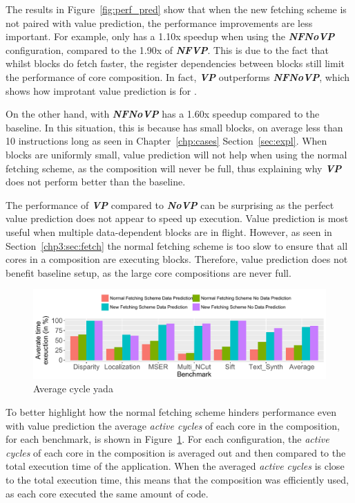 The results in Figure~\ref{fig:perf_pred} show that when the new fetching scheme is not paired with value prediction, the performance improvements are less important.
For example,  only has a 1.10x speedup when using the \textbf{\textit{NFNoVP}} configuration, compared to the 1.90x of \textbf{\textit{NFVP}}.
This is due to the fact that whilst blocks do fetch faster, the register dependencies between blocks still limit the performance of core composition.
In fact, \textbf{\textit{VP}} outperforms \textbf{\textit{NFNoVP}}, which shows how improtant value prediction is for .

On the other hand,  with \textbf{\textit{NFNoVP}} has a 1.60x speedup compared to the baseline.
In this situation, this is because  has small blocks, on average less than 10 instructions long as seen in Chapter~\ref{chp:cases} Section~\ref{sec:expl}.
When blocks are uniformly small, value prediction will not help when using the normal fetching scheme, as the composition will never be full, thus explaining why \textbf{\textit{VP}} does not perform better than the baseline.

The performance of \textit{\textbf{VP}} compared to \textit{\textbf{NoVP}} can be surprising as the perfect value prediction does not appear to speed up execution.
Value prediction is most useful when multiple data-dependent blocks are in flight.
However, as seen in Section~\ref{chp3:sec:fetch} the normal fetching scheme is too slow to ensure that all cores in a composition are executing blocks.
Therefore, value prediction does not benefit baseline setup, as the large core compositions are never full.

\begin{figure}[t]
    \centering
    \includegraphics[width=1\textwidth]{chapter3/graphics/perf_av_cycle_exec.pdf}
    \caption{Average cycle yada}
    \label{fig:perf_av_cycle}
	\vspace{1em}
\end{figure}

To better highlight how the normal fetching scheme hinders performance even with value prediction the average \textit{active cycles} of each core in the composition, for each benchmark, is shown in Figure~\ref{fig:perf_av_cycle}.
For each configuration, the \textit{active cycles} of each core in the composition is averaged out and then compared to the total execution time of the application.
When the averaged \textit{active cycles} is close to the total execution time, this means that the composition was efficiently used, as each core executed the same amount of code.

